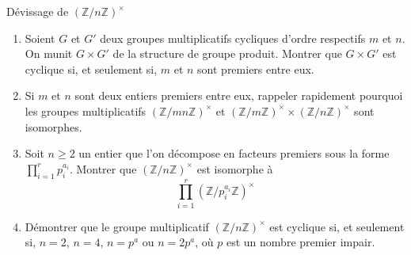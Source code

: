 \documentclass[french,a4paper]{article}
\newcommand{\Z}{\mathbb{Z}}
\theoremstyle{plain}
\theoremstyle{definition}
\theoremstyle{remark}
\begin{document}
\begin{ex}{Dévissage de $(\Z/n\Z)^\times$}
	\begin{enumerate}
		\item Soient $G$ et $G'$ deux groupes multiplicatifs cycliques d'ordre respectifs $m$ et $n$. On munit $G\times G'$ de la structure de groupe produit. Montrer que $G\times G'$ est cyclique si, et seulement si, $m$ et $n$ sont premiers entre eux.
		\item Si $m$ et $n$ sont deux entiers premiers entre eux, rappeler rapidement pourquoi les groupes multiplicatifs $(\Z/mn\Z)^\times$ et $(\Z/m\Z)^\times\times(\Z/n\Z)^\times$ sont isomorphes.
		\item Soit $n\geqslant 2$ un entier que l'on décompose en facteurs premiers sous la forme $\displaystyle\prod_{i=1}^{r}p_i^{a_i}$. Montrer que $(\Z/n\Z)^\times$ est isomorphe à $$\prod_{i=1}^{r}(\Z/p_i^{a_i}\Z)^\times$$
		\item Démontrer que le groupe multiplicatif $(\Z/n\Z)^\times$ est cyclique si, et seulement si, $n=2$, $n=4$, $n=p^a$ ou $n=2p^a$, où $p$ est un nombre premier impair.
	\end{enumerate}
\end{ex}
\end{document}
